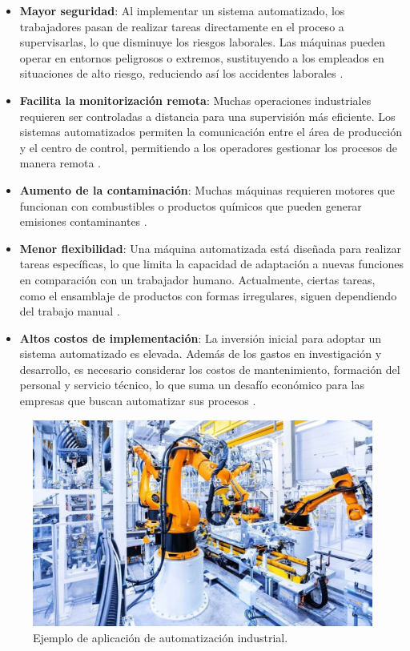 \begin{itemize}
\item \textbf{Mayor seguridad}: Al implementar un sistema automatizado, los trabajadores pasan de realizar tareas directamente en el proceso a supervisarlas, lo que disminuye los riesgos laborales. Las máquinas pueden operar en entornos peligrosos o extremos, sustituyendo a los empleados en situaciones de alto riesgo, reduciendo así los accidentes laborales \cite{des_ventajas_2}.

\item \textbf{Facilita la monitorización remota}: Muchas operaciones industriales requieren ser controladas a distancia para una supervisión más eficiente. Los sistemas automatizados permiten la comunicación entre el área de producción y el centro de control, permitiendo a los operadores gestionar los procesos de manera remota \cite{des_ventajas_2}.

\item \textbf{Aumento de la contaminación}: Muchas máquinas requieren motores que funcionan con combustibles o productos químicos que pueden generar emisiones contaminantes \cite{des_ventajas_1}.

\item \textbf{Menor flexibilidad}: Una máquina automatizada está diseñada para realizar tareas específicas, lo que limita la capacidad de adaptación a nuevas funciones en comparación con un trabajador humano. Actualmente, ciertas tareas, como el ensamblaje de productos con formas irregulares, siguen dependiendo del trabajo manual \cite{des_ventajas_1}.

\item \textbf{Altos costos de implementación}: La inversión inicial para adoptar un sistema automatizado es elevada. Además de los gastos en investigación y desarrollo, es necesario considerar los costos de mantenimiento, formación del personal y servicio técnico, lo que suma un desafío económico para las empresas que buscan automatizar sus procesos \cite{des_ventajas_2}.
\end{itemize}

\begin{figure} [h!]
  \begin{center}
    \includegraphics[width=13cm]{figs/automatizacion_industrial.jpg}
  \end{center}
  \caption{\centering Ejemplo de aplicación de automatización industrial.}
  \label{fig:automatizacion_industrial}
\end{figure}


